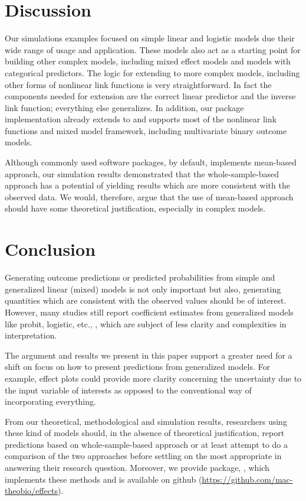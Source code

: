 \section{Discussion}

Our simulations examples focused on simple linear and logistic models due their wide range of usage and application. These models also act as a starting point for building other complex models, including mixed effect models and models with categorical predictors. The logic for extending to more complex models, including other forms of nonlinear link functions is very straightforward. In fact the components needed for extension are the correct linear predictor and the inverse link function; everything else generalizes. In addition, our  package implementation already extends to and supports most of the nonlinear link functions and mixed model framework, including multivariate binary outcome models.

Although commonly used  software packages, by default, implements mean-based approach, our simulation results demonstrated that the whole-sample-based approach has a potential of yielding results which are more consistent with the observed data. We would, therefore, argue that the use of mean-based approach should have some theoretical justification, especially in complex models. 

\section{Conclusion}

Generating outcome predictions or predicted probabilities from simple and generalized linear (mixed) models is not only important but also, generating quantities which are consistent with the observed values should be of interest. However, many studies still report coefficient estimates from generalized models like probit, logistic, etc., \citep{hanmer2013behind}, which are subject of less clarity and complexities in interpretation.

The argument and results we present in this paper support a greater need for a shift on focus on how to present predictions from generalized models. For example, effect plots could provide more clarity concerning the uncertainty due to the input variable of interests as opposed to the conventional way of incorporating everything. 

From our theoretical, methodological and simulation results, researchers using these kind of models should, in the absence of theoretical justification, report predictions based on whole-sample-based approach or at least attempt to do a comparison of the two approaches before settling on the most appropriate in answering their research question. Moreover, we provide  package, , which implements these methods and is available on github (\href{https://github.com/mac-theobio/effects}{https://github.com/mac-theobio/effects}).


